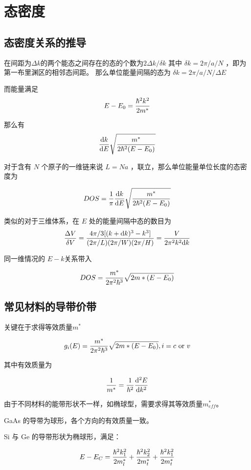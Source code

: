 \documentclass[cn,11pt,chinese,black,simple]{../elegantbook}
\begin{document}
\fi 

\chapter{态密度}

\section{态密度关系的推导}

在间距为\(\Delta k\)的两个能态之间存在的态的个数为\(2 \Delta k / \delta k\) 其中 \(\delta k = 2 \pi / a / N\) ，即为第一布里渊区的相邻态间距。
那么单位能量间隔的态为 \(\delta k = 2 \pi / a / N/ \Delta E\)

而能量满足\[E-E_0 = \displaystyle\frac{\hbar^2 k^2}{2 m^*}\]
 
那么有\[\displaystyle\frac{\mathrm{d}k}{\mathrm{d}E} \sqrt{\displaystyle\frac{m^*}{2 \hbar^2 (E-E_0)}}\]

对于含有 \(N\) 个原子的一维链来说 \(L = N a\) ，联立，那么单位能量单位长度的态密度为

\[DOS = \displaystyle\frac{1}{\pi}\displaystyle\frac{\mathrm{d}k}{\mathrm{d}E} \sqrt{\displaystyle\frac{m^*}{2 \hbar^2 (E-E_0)}} \]


类似的对于三维体系，在 \(E\) 处的能量间隔中态的数目为 
\[\displaystyle\frac{\Delta V}{\delta V} = \displaystyle\frac{4 \pi /3 [(k + \mathrm{d}k)^3 - k^3 ]}{(2 \pi / L)(2 \pi / W)(2 \pi / H)} = \displaystyle\frac{V}{2 \pi^2 k^2 \mathrm{d}k}\]

同一维情况的 \(E-k\)关系带入

\[DOS = \displaystyle\frac{m^*}{2 \pi^2 \hbar^3} \sqrt{2 m* (E-E_0)}\]

\section{常见材料的导带价带}

关键在于求得等效质量\(m^*\)

\[g_i(E) = \displaystyle\frac{m^*}{2 \pi^2 \hbar^3} \sqrt{2 m* (E-E_0)}, i = c\  \text{or}\  v\]

其中有效质量为

\[
\displaystyle\frac{1}{m^*} = \displaystyle\frac{1}{\hbar^2} \displaystyle\frac{\mathrm{d}^2E}{\mathrm{d}k^2}  
\]

由于不同材料的能带形状不一样，如椭球型，需要求得其等效质量\(m^*_{eff}\)。

GaAs 的导带为球形，各个方向的有效质量一致。

Si 与 Ge 的导带形状为椭球形，满足：

\[
E - E_C = \displaystyle\frac{\hbar^2 k_1^2}{2 m_l ^*} +\displaystyle\frac{\hbar^2 k_2^2}{2 m_t ^*} + \displaystyle\frac{\hbar^2 k_1^2}{2 m_t ^*} 
\]
\end{document}
